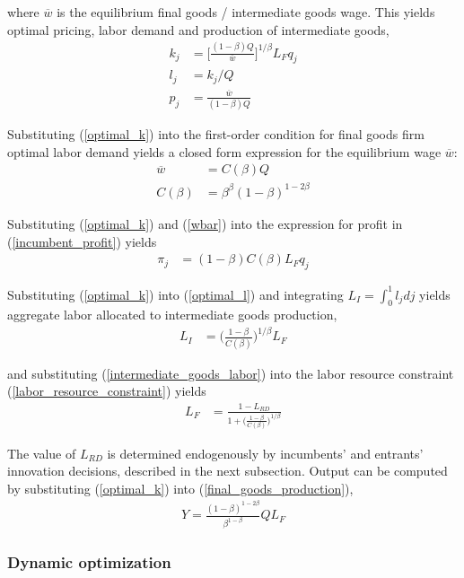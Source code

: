 \documentclass[12pt,english]{article}
\theoremstyle{remark}
\begin{document}
where $\overline{w}$ is the equilibrium final goods / intermediate goods wage.
This yields optimal pricing, labor demand and production of intermediate goods,
\begin{align}
k_j &= \Big[ \frac{(1-\beta) Q}{\overline{w}} \Big]^{1/\beta}L_F q_j  \label{optimal_k}\\
l_j &= k_j / Q \label{optimal_l}\\
p_j &= \frac{\overline{w}}{(1-\beta) Q} \label{optimal_p}
\end{align}

Substituting (\ref{optimal_k}) into the first-order condition for final goods firm optimal labor demand yields a closed form expression for the equilibrium wage $\overline{w}$:
\begin{align}
\overline{w} &= C(\beta) Q \label{wbar} \\
C(\beta) &= \beta^{\beta} (1-\beta)^{1-2\beta} \label{def_cbeta}
\end{align}

Substituting (\ref{optimal_k}) and (\ref{wbar}) into the expression for profit in (\ref{incumbent_profit}) yields
\begin{align}
\pi_j &= (1-\beta) C(\beta) L_F q_j \label{profits_eq}
\end{align}

Substituting (\ref{optimal_k}) into (\ref{optimal_l}) and integrating $L_I = \int_0^1 l_j dj$ yields aggregate labor allocated to intermediate goods production,
\begin{align}
L_I &= \Big( \frac{1-\beta}{C(\beta)} \Big)^{1 / \beta} L_F \label{intermediate_goods_labor}
\end{align}

and substituting (\ref{intermediate_goods_labor}) into the labor resource constraint (\ref{labor_resource_constraint}) yields
\begin{align}
L_F &= \frac{1 - L_{RD}}{1 + \Big(\frac{1-\beta}{C(\beta)}\Big)^{1/\beta}}
\end{align}

The value of $L_{RD}$ is determined endogenously by incumbents' and entrants' innovation decisions, described in the next subsection. Output can be computed by substituting (\ref{optimal_k}) into (\ref{final_goods_production}), 
\begin{align}
Y = \frac{(1-\beta)^{1-2\beta}}{\beta^{1-\beta}} Q L_F \label{flow_output}
\end{align}
\subsubsection{Dynamic optimization}
\end{document}
